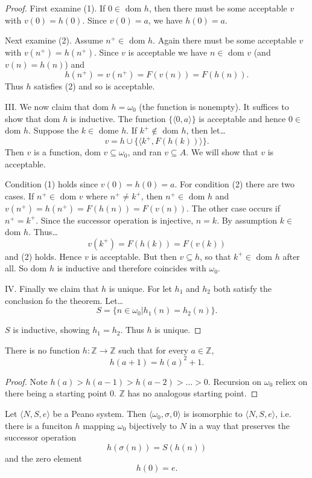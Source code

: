 \begin{proof}
First examine (1). If $0 \in$ dom $h$, then there must be some acceptable $v$ with $v(0) = h(0).$ Since $v(0) = a$, we have $h(0) = a$.

Next examine (2). Assume $n^+ \in$ dom $h$. Again there must be some acceptable $v$ with $v(n^+) = h(n^+)$. Since $v$ is acceptable we have $n \in$ dom $v$ (and $v(n) = h(n)$) and
$$h(n^+) = v(n^+) = F(v(n)) = F(h(n)).$$
Thus $h$ satisfies (2) and so is acceptable.\newline


III. We now claim that dom $h = \omega_0$ (the function is nonempty). It suffices to show that dom $h$ is inductive. The function $\{ \langle 0,a \rangle \}$ is acceptable and hence
$0 \in$ dom $h$. Suppose the $k \in$ dome $h$. If $k^+ \not\in$ dom $h$, then let\dots
$$v = h \cup \{ \langle k^+, F(h(k)) \rangle \}.$$
Then $v$ is a function, dom $v \subseteq \omega_0$, and ran $v \subseteq A$. We will show that $v$ is acceptable.

Condition (1) holds since $v(0) = h(0) = a.$ For condition (2) there are two cases. If $n^+ \in$ dom $v$ where $n^+ \neq k^+$, then $n^+ \in$ dom $h$ and $v(n^+) = h(n^+) = F(h(n)) = F(v(n)).$
The other case occurs if $n^+ = k^+$. Since the successor operation is injective, $n=k$. By assumption $k \in$ dom $h$. Thus\dots
$$v(k^+) = F(h(k)) = F(v(k))$$
and (2) holds. Hence $v$ is acceptable. But then $v \subseteq h$, so that $k^+ \in$ dom $h$ after all. So dom $h$ is inductive and therefore coincides with $\omega_0$.\newline


IV. Finally we claim that $h$ is unique. For let $h_1$ and $h_2$ both satisfy the conclusion fo the theorem. Let\dots
$$S = \{n \in \omega_0 | h_1(n) = h_2(n) \}.$$

$S$ is inductive, showing $h_1 = h_2$. Thus $h$ is unique.
\end{proof}

\begin{example}
There is no function $h: \mathbb{Z} \rightarrow \mathbb{Z}$ such that for every $a \in \mathbb{Z}$,
$$h(a + 1) = h(a)^2 + 1.$$
\end{example}

\begin{proof}
Note $h(a) > h(a-1) > h(a-2) > \dots > 0.$  Recursion on $\omega_0$ reliex on there being a starting point $0$. $\mathbb{Z}$ has no analogous starting point.
\end{proof}

\begin{theorem}
Let $\langle N, S, e \rangle$ be a Peano system. Then $\langle \omega_0, \sigma, 0 \rangle$ is isomorphic to $\langle N, S, e \rangle$, i.e. there is a funciton $h$
mapping $\omega_0$ bijectively to $N$ in a way that preserves the successor operation
$$h(\sigma(n)) = S(h(n))$$
and the zero element
$$h(0) = e.$$
\end{theorem}


